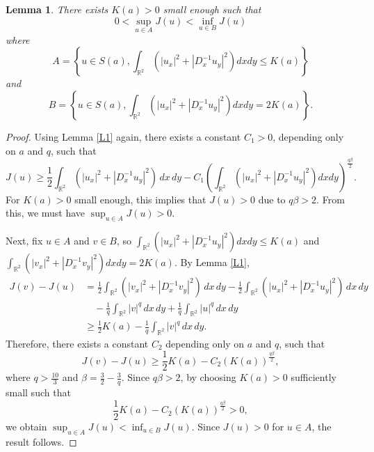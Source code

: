 \documentclass[11pt]{amsart}
\newtheorem{lemma}[theorem]{Lemma}
\numberwithin{equation}{section}
\begin{document}
{{{\begin{lemma}  \label{PJ1} There exists $K(a)>0$ small enough such that
    $$
    0<\sup_{u\in A} J(u)<\inf_{u\in B} J(u)
    $$
    where
    $$
    A=\left\{u\in S(a), \int_{\mathbb{R}^{2}} \left(|u_{x}|^{2} + |D^{-1}_{x} u_{y}|^{2} \right)dx dy\leq K(a) \right\}
    $$
    and
    $$
    B=\left\{u\in S(a), \int_{\mathbb{R}^{2}} \left(|u_{x}|^{2} + |D^{-1}_{x} u_{y}|^{2} \right)dx dy=2K(a) \right\}.
    $$
\end{lemma}

\begin{proof}
    Using Lemma \ref{L1} again, there exists a constant $C_1>0$,
    depending only on $ a $ and $ q $, such that
    $$
    J(u) \geq \frac{1}{2} \int_{\mathbb{R}^{2}} \left( |u_{x}|^{2} + |D^{-1}_{x} u_{y}|^{2} \right) \, dx \, dy -C_1\left(\int_{\mathbb{R}^2}\left(\left|u_x\right|^2+\left|D_x^{-1} u_y\right|^2\right) d xdy\right)^{\frac{q\beta}{2}}.
    $$
    {For $K(a)>0$ small enough,  this implies that $J(u)>0$ due to $q \beta > 2$.} From this, we must have $\sup _{u \in A} J(u)>0$.

    {Next, fix $u \in A$ and $v \in B$, so $\displaystyle \int_{\mathbb{R}^{2}} \left(|u_{x}|^{2} + |D^{-1}_{x} u_{y}|^{2} \right)dx dy\leq K(a)$ and $\displaystyle \int_{\mathbb{R}^{2}} \left(|v_{x}|^{2} + |D^{-1}_{x} v_{y}|^{2} \right)dx dy=2K(a)$.} By Lemma \ref{L1},
    $$
    \begin{aligned}
        J(v) - J(u) &= \frac{1}{2} \int_{\mathbb{R}^{2}} \left( |v_{x}|^{2} + |D^{-1}_{x} v_{y}|^{2} \right) \, dx \, dy
        - \frac{1}{2} \int_{\mathbb{R}^{2}} \left( |u_{x}|^{2} + |D^{-1}_{x} u_{y}|^{2} \right) \, dx \, dy \\
        &\quad - \frac{1}{q} \int_{\mathbb{R}^2} |v|^q \, dx \, dy
        + \frac{1}{q} \int_{\mathbb{R}^2} |u|^q \, dx \, dy \\
        &\geq \frac{1}{2}K(a)-\frac{1}{q} \int_{\mathbb{R}^2} |v|^q \, dx \, dy.
    \end{aligned}
    $$
    Therefore, there exists a constant $C_2$
    depending only on $ a $ and $ q $, such that
    \[
    J(v) - J(u) \geq \frac{1}{2}K(a) - C_2 \left(K(a)\right)^{\frac{q\beta}{2}},
    \]
    where \( q > \frac{10}{3} \) and \( \beta = \frac{3}{2} - \frac{3}{q} \). Since \( q\beta > 2 \), by choosing \( K(a) > 0 \) sufficiently small such that
    \[
    \frac{1}{2}K(a) - C_2\left(K(a)\right)^{\frac{q\beta}{2}} > 0,
    \]
    {we obtain $\sup_{u\in A} J(u)<\inf_{u\in B} J(u)$. Since $J(u) > 0$ for $u \in A$, the result follows.}
\end{proof}


}}}
\end{document}
